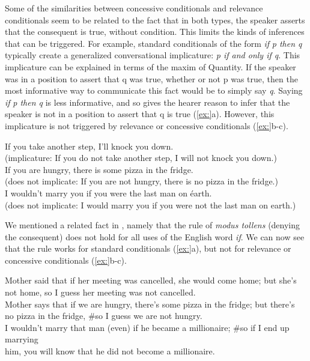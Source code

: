 Some of the similarities between concessive conditionals and relevance conditionals seem to be related to the fact that in both types, the speaker asserts that the consequent is true, without condition. This limits the kinds of inferences that can be triggered. For example, standard conditionals of the form \textit{if} \textit{p then q} typically create a generalized conversational implicature: \textit{p if and only if q}. This implicature can be explained in terms of the maxim of Quantity. If the speaker was in a position to assert that q was true, whether or not p was true, then the most informative way to communicate this fact would be to simply say \textit{q}. Saying \textit{if} \textit{p then q} is less informative, and so gives the hearer reason to infer that the speaker is not in a position to assert that q is true (\ref{ex:}a). However, this implicature is not triggered by relevance or concessive conditionals (\ref{ex:}b-c).


\ea
\ea If you take another step, I’ll knock you down.\\
  (implicature: If you do not take another step, I will not knock you down.)\\
\ex If you are hungry, there is some pizza in the fridge.\\
  (does not implicate: If you are not hungry, there is no pizza in the fridge.)\\
\ex I wouldn’t marry you if you were the last man on éarth.\\
  (does not implicate: I would marry you if you were not the last man on earth.)
\z
\z


We mentioned a related fact in , namely that the rule of \textit{modus tollens} (denying the consequent) does not hold for all uses of the English word \textit{if}. We can now see that the rule works for standard conditionals (\ref{ex:}a), but not for relevance or concessive conditionals (\ref{ex:}b-c).


\ea
\ea Mother said that if her meeting was cancelled, she would come home; but she’s\\
  not home, so I guess her meeting was not cancelled.\\
\ex Mother says that if we are hungry, there’s some pizza in the fridge; but there’s\\
  no pizza in the fridge, \#so I guess we are not hungry.\\
\ex I wouldn’t marry that man (even) if he became a millionaire; \#so if I end up marrying\\
  him, you will know that he did not become a millionaire.
                       \z
\z


